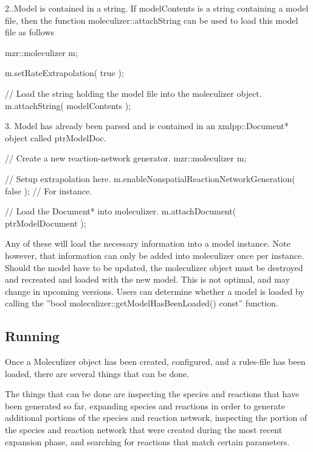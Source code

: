 2..Model is contained in a string.
If modelContents is a string containing a model file, then the
function moleculizer::attachString can be used to load this model file
as follows

\begin{LocalCPP}[caption=Loading a MZR string into Moleculizer]
mzr::moleculizer m; 

m.setRateExtrapolation( true );

// Load the string holding the model file into the moleculizer object.
m.attachString( modelContents );
\end{LocalCPP}

3.  Model has already been parsed and is contained in an
xmlpp::Document* object called ptrModelDoc.

\begin{LocalCPP}[caption=Loading an XML document into moleculizer]
// Create a new reaction-network generator.
mzr::moleculizer m;

// Setup extrapolation here.
m.enableNonspatialReactionNetworkGeneration( false );  // For
instance.

// Load the Document* into moleculizer.
m.attachDocument( ptrModelDocument );
\end{LocalCPP}

Any of these will load the necessary information into a model
instance. Note however, that information can only be added into
moleculizer once per instance.  Should the model have to be updated,
the moleculizer object must be destroyed and recreated and loaded with
the new model.  This is not optimal, and may change in upcoming
versions.  Users can determine whether a model is loaded by calling
the ''bool moleculizer::getModelHasBeenLoaded() const'' function.  

\subsection{Running}
Once a Moleculizer object has been created, configured, and a
rules-file has been loaded, there are several things that can be done.

The things that can be done are inspecting the species and reactions
that have been generated so far, expanding species and reactions in
order to generate additional portions of the species and reaction
network, inspecting the portion of the species and reaction network
that were created during the most recent expansion phase, and
searching for reactions that match certain parameters.  

